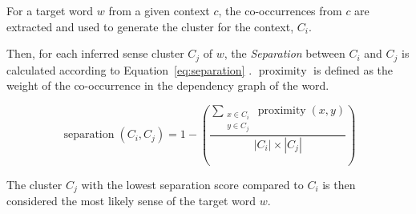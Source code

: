 For a target word $w$ from a given context $c$, the co-occurrences from $c$ are
extracted and used to generate the cluster for the context, $C_i$.

Then, for each inferred sense cluster $C_j$ of $w$, the
\emph{Separation} between $C_i$ and $C_j$ is calculated according to
Equation~\ref{eq:separation} \citep{hope2013uos}. $\operatorname{proximity}$ is
defined as the weight of the co-occurrence in the dependency graph of the word.

\begin{equation}
 \operatorname{separation}(C_i,C_j) =
 1 - \left(
 \frac {\sum_{\substack{x \in C_i \\ y \in C_j}} \operatorname{proximity}(x,y)}
       {|C_i| \times |C_j|}
 \right)
\label{eq:separation}
\end{equation}

The cluster $C_j$ with the lowest separation score compared to $C_i$ is then
considered the most likely sense of the target word $w$.


